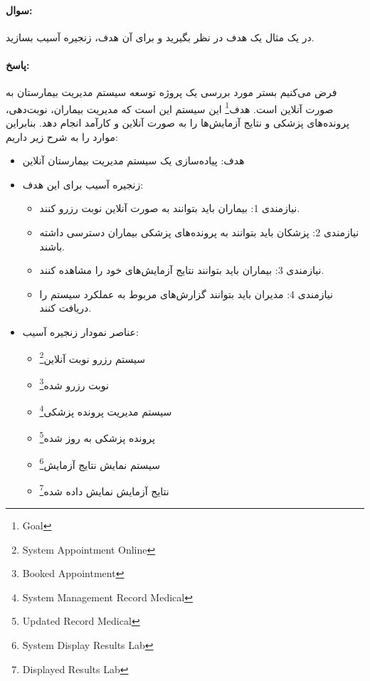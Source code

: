 \documentclass[a4paper,10pt]{article}
\begin{document}
    \paragraph{سوال:} در یک مثال یک هدف در نظر بگیرید و برای آن هدف، زنجیره آسیب بسازید.

    \paragraph{پاسخ:} فرض می‌کنیم بستر مورد بررسی یک پروژه توسعه سیستم مدیریت بیمارستان به صورت آنلاین است. هدف\footnote{\hspace{2pt}Goal} این سیستم این است که مدیریت بیماران، نوبت‌دهی، پرونده‌های پزشکی و نتایج آزمایش‌ها را به صورت آنلاین و کارآمد انجام دهد. بنابراین موارد را به شرح زیر داریم:

    \begin{itemize}
        
        \item هدف: پیاده‌سازی یک سیستم مدیریت بیمارستان آنلاین

        \item زنجیره آسیب برای این هدف:
        
        \begin{itemize}
            
            \item نیازمندی 1: بیماران باید بتوانند به صورت آنلاین نوبت رزرو کنند.
            \item نیازمندی 2: پزشکان باید بتوانند به پرونده‌های پزشکی بیماران دسترسی داشته باشند.
            \item نیازمندی 3: بیماران باید بتوانند نتایج آزمایش‌های خود را مشاهده کنند.
            \item نیازمندی 4: مدیران باید بتوانند گزارش‌های مربوط به عملکرد سیستم را دریافت کنند.
            
        \end{itemize}

        \item عناصر نمودار زنجیره آسیب:
        
        \begin{itemize}
            
            \item سیستم رزرو نوبت آنلاین\footnote{\hspace{2pt}System Appointment Online}
            \item نوبت رزرو شده\footnote{\hspace{2pt}Booked Appointment}
            \item سیستم مدیریت پرونده پزشکی\footnote{\hspace{2pt}System Management Record Medical}
            \item پرونده پزشکی به روز شده\footnote{\hspace{2pt}Updated Record Medical}
            \item سیستم نمایش نتایج آزمایش\footnote{\hspace{2pt}System Display Results Lab}
            \item نتایج آزمایش نمایش داده شده\footnote{\hspace{2pt}Displayed Results Lab}


\end{itemize}
\end{itemize}
\end{document}
